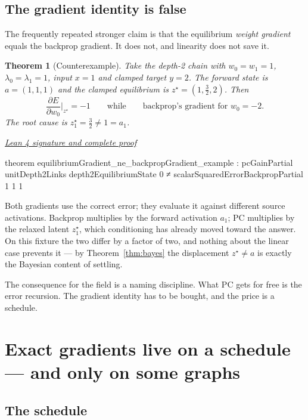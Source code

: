 \documentclass[11pt]{article}
\newtheorem{theorem}{Theorem}[section]
\newcommand{\leancommit}{647168959fc57cfe97526d9525d33e63681b8e2f}
\newcommand{\leansignaturelink}[2]{%
  \par\Needspace{0.3\textheight}\smallskip\noindent
  \href{https://github.com/zariuq/MeTTapedia/blob/\leancommit/#1\#L#2}{%
    \scriptsize\itshape Lean 4 signature and complete proof}\par\nobreak}
\begin{document}
\subsection{The gradient identity is false}

The frequently repeated stronger claim is that the equilibrium \emph{weight gradient}
equals the backprop gradient. It does not, and linearity does not save it.

\begin{theorem}[Counterexample]\label{thm:gradne}
Take the depth-2 chain with $w_0 = w_1 = 1$, $\lambda_0 = \lambda_1 = 1$, input $x=1$
and clamped target $y=2$. The forward state is $a = (1,1,1)$ and the clamped equilibrium
is $z^\star = (1,\tfrac32,2)$. Then
\[
\frac{\partial E}{\partial w_0}\Big|_{z^\star} = -1
\qquad\text{while}\qquad
\text{backprop's gradient for } w_0 = -2 .
\]
The root cause is $z^\star_1 = \tfrac32 \neq 1 = a_1$.
\end{theorem}

\leansignaturelink{lean/mettapedia/Mettapedia/MachineLearning/NeuralNetworks/%
PredictiveCoding/BackpropExactness.lean}{101}
\begin{leansignature}
theorem equilibriumGradient_ne_backpropGradient_example :
    pcGainPartial unitDepth2Links depth2EquilibriumState 0 ≠
      scalarSquaredErrorBackpropPartial 1 1 1
\end{leansignature}

Both gradients use the correct error; they evaluate it against different source
activations. Backprop multiplies by the forward activation $a_1$; PC multiplies by the
relaxed latent $z^\star_1$, which conditioning has already moved toward the answer. On
this fixture the two differ by a factor of two, and nothing about the linear case
prevents it --- by Theorem~\ref{thm:bayes} the displacement $z^\star \neq a$ is exactly
the Bayesian content of settling.

The consequence for the field is a naming discipline. What PC gets for free is the error
recursion. The gradient identity has to be bought, and the price is a schedule.

\section{Exact gradients live on a schedule --- and only on some graphs}
\label{sec:schedule}

\subsection{The schedule}
\end{document}
